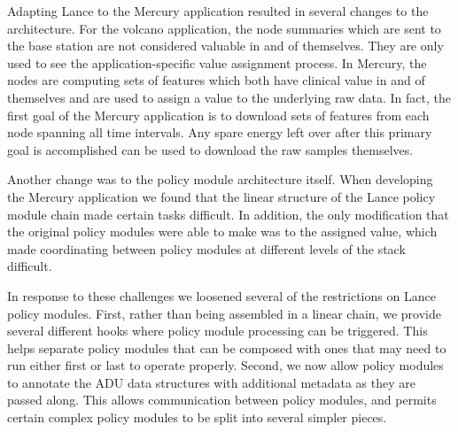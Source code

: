 Adapting Lance to the Mercury application resulted in several changes to the
architecture. For the volcano application, the node summaries which are sent
to the base station are not considered valuable in and of themselves. They
are only used to see the application-specific value assignment process. In
Mercury, the nodes are computing sets of features which both have clinical
value in and of themselves and are used to assign a value to the underlying
raw data. In fact, the first goal of the Mercury application is to download
sets of features from each node spanning all time intervals. Any spare energy
left over after this primary goal is accomplished can be used to download the
raw samples themselves.

Another change was to the policy module architecture itself. When developing
the Mercury application we found that the linear structure of the Lance
policy module chain made certain tasks difficult. In addition, the only
modification that the original policy modules were able to make was to the
assigned value, which made coordinating between policy modules at different
levels of the stack difficult.

In response to these challenges we loosened several of the restrictions on
Lance policy modules. First, rather than being assembled in a linear chain,
we provide several different hooks where policy module processing can be
triggered. This helps separate policy modules that can be composed with ones
that may need to run either first or last to operate properly. Second, we now
allow policy modules to annotate the ADU data structures with additional
metadata as they are passed along. This allows communication between policy
modules, and permits certain complex policy modules to be split into several
simpler pieces.
